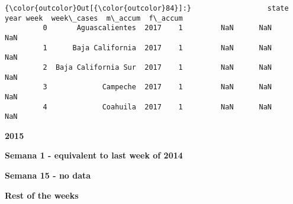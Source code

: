 \documentclass[11pt]{article}
\begin{document}
\begin{Verbatim}[commandchars=\\\{\}]
{\color{outcolor}Out[{\color{outcolor}84}]:}                  state  year week  week\_cases  m\_accum  f\_accum
         0       Aguascalientes  2017    1         NaN      NaN      NaN
         1      Baja California  2017    1         NaN      NaN      NaN
         2  Baja California Sur  2017    1         NaN      NaN      NaN
         3             Campeche  2017    1         NaN      NaN      NaN
         4             Coahuila  2017    1         NaN      NaN      NaN
\end{Verbatim}
            
    \textbf{2015}

    \textbf{Semana 1 - equivalent to last week of 2014}

    \textbf{Semana 15 - no data}

    \textbf{Rest of the weeks}
\end{document}
